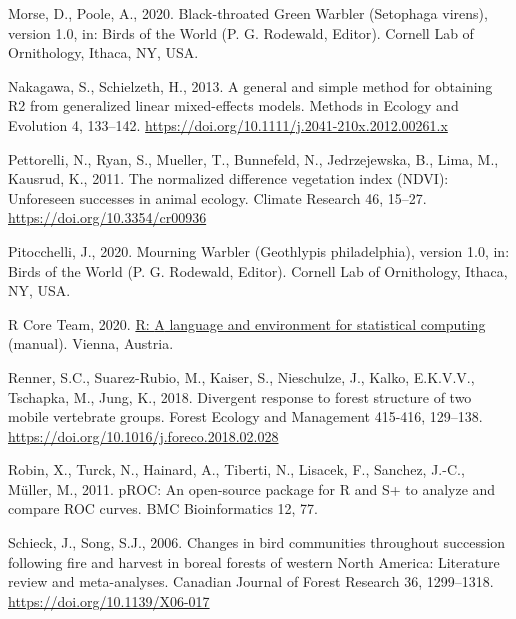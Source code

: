 \documentclass[
]{article}
\newlength{\cslhangindent}
\newlength{\cslentryspacingunit} %
\newenvironment{CSLReferences}[2] %
 {%
  \setlength{\parindent}{0pt}
  \ifodd #1
  \let\oldpar\par
  \def\par{\hangindent=\cslhangindent\oldpar}
  \fi
  \setlength{\parskip}{#2\cslentryspacingunit}
 }%
 {}
\begin{document}
\begin{CSLReferences}{1}{0}
\leavevmode{}%
Morse, D., Poole, A., 2020. Black-throated {Green} {Warbler} ({Setophaga} virens), version 1.0, in: Birds of the {World} ({P}. {G}. {Rodewald}, {Editor}). Cornell Lab of Ornithology, Ithaca, NY, USA.

\leavevmode{}%
Nakagawa, S., Schielzeth, H., 2013. A general and simple method for obtaining {R2} from generalized linear mixed-effects models. Methods in Ecology and Evolution 4, 133--142. \url{https://doi.org/10.1111/j.2041-210x.2012.00261.x}

\leavevmode{}%
Pettorelli, N., Ryan, S., Mueller, T., Bunnefeld, N., Jedrzejewska, B., Lima, M., Kausrud, K., 2011. The normalized difference vegetation index ({NDVI}): Unforeseen successes in animal ecology. Climate Research 46, 15--27. \url{https://doi.org/10.3354/cr00936}

\leavevmode{}%
Pitocchelli, J., 2020. Mourning {Warbler} ({Geothlypis} philadelphia), version 1.0, in: Birds of the {World} ({P}. {G}. {Rodewald}, {Editor}). Cornell Lab of Ornithology, Ithaca, NY, USA.

\leavevmode{}%
R Core Team, 2020. \href{https://www.R-project.org/}{R: {A} language and environment for statistical computing} (manual). Vienna, Austria.

\leavevmode{}%
Renner, S.C., Suarez-Rubio, M., Kaiser, S., Nieschulze, J., Kalko, E.K.V.V., Tschapka, M., Jung, K., 2018. Divergent response to forest structure of two mobile vertebrate groups. Forest Ecology and Management 415-416, 129--138. \url{https://doi.org/10.1016/j.foreco.2018.02.028}

\leavevmode{}%
Robin, X., Turck, N., Hainard, A., Tiberti, N., Lisacek, F., Sanchez, J.-C., Müller, M., 2011. {pROC}: An open-source package for {R} and {S}+ to analyze and compare {ROC} curves. BMC Bioinformatics 12, 77.

\leavevmode{}%
Schieck, J., Song, S.J., 2006. Changes in bird communities throughout succession following fire and harvest in boreal forests of western {North} {America}: {Literature} review and meta-analyses. Canadian Journal of Forest Research 36, 1299--1318. \url{https://doi.org/10.1139/X06-017}


\end{CSLReferences}
\end{document}

